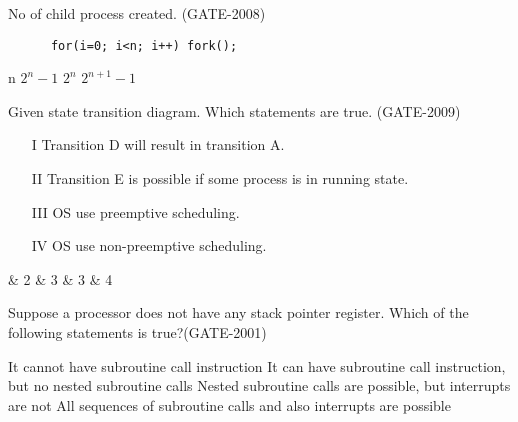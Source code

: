 \vspace{0.08in}


\begin{minipage}{\linewidth}

  \question  No of child process created. (GATE-2008)

  \begin{lstlisting}
      for(i=0; i<n; i++) fork();
  \end{lstlisting}

  \begin{oneparchoices}
    \choice n
    \choice \(2^n -1 \)
    \choice \(2^n \)
    \choice \(2^{n+1} -1 \)
  \end{oneparchoices}

\end{minipage}

\vspace{0.08in}


\begin{minipage}{\linewidth}

  \question  Given state transition diagram. Which statements are true. (GATE-2009)

  \begin{enumerate}
      \item[I] Transition D will result in transition A.
      \item[II] Transition E is possible if some process is in running state.
      \item[III] OS use preemptive scheduling.
      \item[IV] OS use non-preemptive scheduling.
   \end{enumerate}

  \begin{oneparchoices}
     \& 2
     \& 3
     \& 3
     \& 4
  \end{oneparchoices}

\end{minipage}

\vspace{0.08in}


\begin{minipage}{\linewidth}

  \question  Suppose a processor does not have any stack pointer register. Which of the following statements is true?(GATE-2001)

  \begin{choices}
    \choice It cannot have subroutine call instruction
    \choice It can have subroutine call instruction, but no nested subroutine calls
    \choice Nested subroutine calls are possible, but interrupts are not
    \choice All sequences of subroutine calls and also interrupts are possible
  \end{choices}

  \end{minipage}

